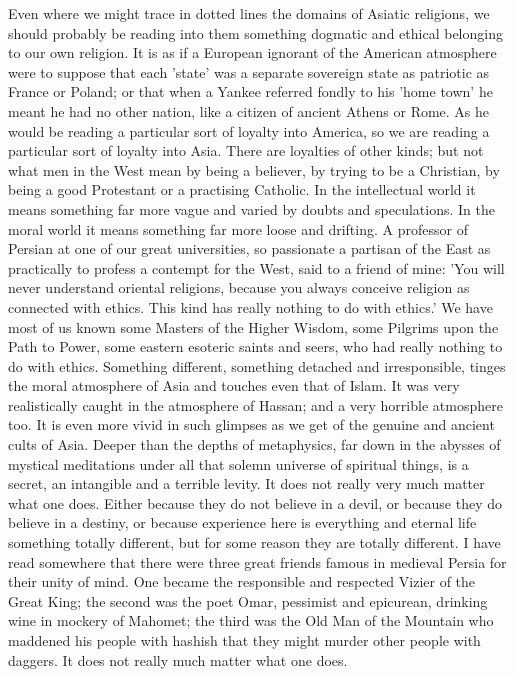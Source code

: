 Even where we might trace in dotted lines the domains of Asiatic religions, we should probably be reading into them something dogmatic and ethical belonging to our own religion. It is as if a European ignorant of the American atmosphere were to suppose that each 'state' was a separate sovereign state as patriotic as France or Poland; or that when a Yankee referred fondly to his 'home town' he meant he had no other nation, like a citizen of ancient Athens or Rome. As he would be reading a particular sort of loyalty into America, so we are reading a particular sort of loyalty into Asia. There are loyalties of other kinds; but not what men in the West mean by being a believer, by trying to be a Christian, by being a good Protestant or a practising Catholic. In the intellectual world it means something far more vague and varied by doubts and speculations. In the moral world it means something far more loose and drifting. A professor of Persian at one of our great universities, so passionate a partisan of the East as practically to profess a contempt for the West, said to a friend of mine: 'You will never understand oriental religions, because you always conceive religion as connected with ethics. This kind has really nothing to do with ethics.' We have most of us known some Masters of the Higher Wisdom, some Pilgrims upon the Path to Power, some eastern esoteric saints and seers, who had really nothing to do with ethics. Something different, something detached and irresponsible, tinges the moral atmosphere of Asia and touches even that of Islam. It was very realistically caught in the atmosphere of Hassan; and a very horrible atmosphere too. It is even more vivid in such glimpses as we get of the genuine and ancient cults of Asia. Deeper than the depths of metaphysics, far down in the abysses of mystical meditations under all that solemn universe of spiritual things, is a secret, an intangible and a terrible levity. It does not really very much matter what one does. Either because they do not believe in a devil, or because they do believe in a destiny, or because experience here is everything and eternal life something totally different, but for some reason they are totally different. I have read somewhere that there were three great friends famous in medieval Persia for their unity of mind. One became the responsible and respected Vizier of the Great King; the second was the poet Omar, pessimist and epicurean, drinking wine in mockery of Mahomet; the third was the Old Man of the Mountain who maddened his people with hashish that they might murder other people with daggers. It does not really much matter what one does.

